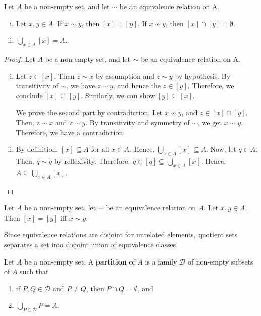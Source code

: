 \documentclass[a4paper,english,12pt]{article}
\begin{document}
\begin{thm}\label{Thm:EqRelPart} Let $A$ be a non-empty set, and let $\sim$ be an equivalence relation on A.
	\begin{enumerate}[i)]
		\item Let $x,y \in A$. If $x \sim y$, then $[x] = [y]$. If $x \nsim y$, then $[x] \cap [y] = \emptyset$.
		\item $\bigcup\limits_{x\in A} [x] = A$.
	\end{enumerate}
\end{thm}
\begin{proof} Let $A$ be a non-empty set, and let $\sim$ be an equivalence relation on A.
	\begin{enumerate}[i)]
		\item Let $z \in [x]$. Then $z \sim x$ by assumption and $z \sim y$ by hypothesis. By transitivity of $\sim$, we have $z \sim y$, and hence the $z \in [y]$. Therefore, we conclude $[x] \subseteq [y]$. Similarly, we can show $[y] \subseteq [x]$. 
		
		We prove the second part by contradiction. Let $x \nsim y$, and $ z \in [x] \cap [y]$. Then, $z \sim x$ and $z \sim y$. By transitivity and symmetry of $\sim$, we get $x \sim y$. Therefore, we have a contradiction.
		\item By definition, $[x] \subseteq A$ for all $x \in A$. Hence, $\bigcup_{x \in A} [x] \subseteq A$. Now, let $q \in A$. Then, $q \sim q$ by reflexivity. Therefore, $q \in [q] \subseteq \bigcup\limits_{x \in A} [x]$. Hence, $A \subseteq \bigcup\limits_{x \in A} [x]$. %
	\end{enumerate}
\end{proof}
\begin{cor} Let $A$ be a non-empty set, let $\sim$ be an equivalence relation on $A$. Let $x, y \in A$. Then $[x] = [y]$ iff $x \sim y$.
\end{cor}
Since equivalence relations are disjoint for unrelated elements, quotient sets separates a set into disjoint union of equivalence classes. 
\begin{defn}[Partition] Let $A$ be a non-empty set. A \textbf{partition} of $A$ is a family $\mathcal{D}$ of non-empty subsets of $A$ such that
	\begin{enumerate}
		\item if $P,Q \in \mathcal{D}$ and $P \neq Q$, then $P \cap Q = \emptyset$, and 
		\item $\bigcup\limits_{P \in \mathcal{D}} P = A$.
	\end{enumerate}	
\end{defn}
\end{document}
